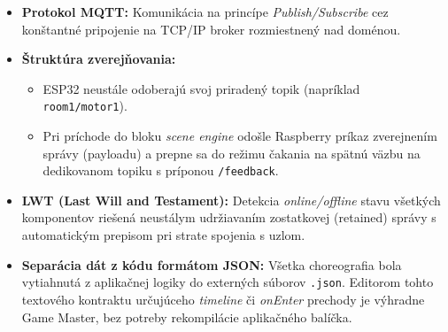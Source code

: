 \begin{itemize}
    \item \textbf{Protokol MQTT:} Komunikácia na princípe \textit{Publish/Subscribe} cez konštantné pripojenie na TCP/IP broker rozmiestnený nad doménou.
    \item \textbf{Štruktúra zverejňovania:} 
    \begin{itemize}
        \item ESP32 neustále odoberajú svoj priradený topik (napríklad \texttt{room1/motor1}).
        \item Pri príchode do bloku \textit{scene engine} odošle Raspberry príkaz zverejnením správy (payloadu) a prepne sa do režimu čakania na spätnú väzbu na dedikovanom topiku s príponou \texttt{/feedback}.
    \end{itemize}
    \item \textbf{LWT (Last Will and Testament):} Detekcia \textit{online/offline} stavu všetkých komponentov riešená neustálym udržiavaním zostatkovej (retained) správy s automatickým prepisom pri strate spojenia s uzlom.
    \item \textbf{Separácia dát z kódu formátom JSON:} Všetka choreografia bola vytiahnutá z aplikačnej logiky do externých súborov \texttt{.json}. Editorom tohto textového kontraktu určujúceho \textit{timeline} či \textit{onEnter} prechody je výhradne Game Master, bez potreby rekompilácie aplikačného balíčka.
\end{itemize}
